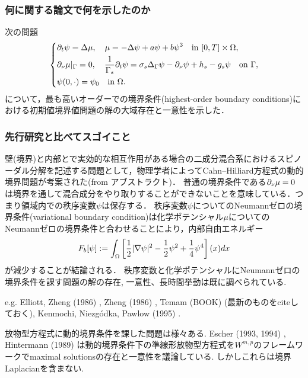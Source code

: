 \documentclass[a4paper]{article}
\begin{document}
	\subsubsection{何に関する論文で何を示したのか}
		次の問題
		\begin{equation}\left\{\begin{aligned}
			&\partial_t\psi = \Delta\mu,\quad \mu = -\Delta\psi + a\psi + b\psi^3\quad \text{in }[0,T]\times\Omega,\\
			&\partial_{\nu}\mu|_{\Gamma} = 0, \quad \frac{1}{\Gamma_s}\partial_t\psi = \sigma_s\Delta_{\Gamma}\psi - \partial_{\nu}\psi + h_s - g_s\psi\quad\text{on }\Gamma,\\
			&\psi(0,\cdot) = \psi_0\quad\text{in }\Omega.
		\end{aligned}\right.\end{equation}
		について，最も高いオーダーでの境界条件(highest-order boundary conditions)における初期値境界値問題の解の大域存在と一意性を示した．
	\subsubsection{先行研究と比べてスゴイこと}
		壁(境界)と内部とで実効的な相互作用がある場合の二成分混合系におけるスピノーダル分解を記述する問題として，物理学者によってCahn--Hilliard方程式の動的境界問題が考案された(from アブストラクト)．
		普通の境界条件である$\partial_{\nu}\mu=0$は境界を通して混合成分をやり取りすることができないことを意味している．つまり領域内での秩序変数$\psi$は保存する．
		秩序変数$\psi$についてのNeumannゼロの境界条件(variational boundary condition)は化学ポテンシャル$\mu$についてのNeumannゼロの境界条件と合わせることにより，内部自由エネルギー
		\begin{equation}
			F_b[\psi] := \int_{\Omega} \left[\frac{1}{2}|\nabla\psi|^2 - \frac{1}{2}\psi^2 + \frac{1}{4}\psi^4\right](x)dx
		\end{equation}
		が減少することが結論される．
		秩序変数と化学ポテンシャルにNeumannゼロの境界条件を課す問題の解の存在, 一意性、長時間挙動は既に調べられている.
		
		e.g. Elliott, Zheng (1986) \cite{ElliottZheng1986}, Zheng (1986) \cite{Zheng1986}, Temam (BOOK) \cite{TemamBOOK} (最新のものをciteしておく), Kenmochi, Niezg\'odka, Pawlow (1995) \cite{KenmochiNiezgodkaPawlow1995}.

		放物型方程式に動的境界条件を課した問題は様々ある.
		Escher (1993, 1994) \cite{Escher1993,Escher1994}, Hintermann (1989) \cite{Hintermann1989} は動的境界条件下の準線形放物型方程式を$W^{m,p}$のフレームワークでmaximal solutionsの存在と一意性を議論している.
		しかしこれらは境界Laplacianを含まない.
\end{document}
